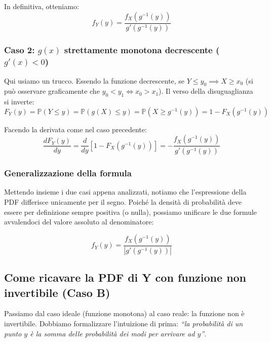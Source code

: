 In definitiva, otteniamo:
\begin{equation}
f_Y(y) = \frac{f_X(g^{-1}(y))}{g'(g^{-1}(y))}
\end{equation}

\subsubsection*{Caso 2: $g(x)$ strettamente monotona decrescente ($g'(x) < 0$)}

Qui usiamo un trucco. Essendo la funzione decrescente, se $Y \le y_0 \implies X \ge x_0$ (si può osservare graficamente che $y_0 < y_1 \iff x_0 > x_1$). Il verso della disuguaglianza si inverte:
\begin{equation}
F_Y(y) = \mathbb{P}(Y \le y) = \mathbb{P}(g(X) \le y) = \mathbb{P}(X \ge g^{-1}(y)) = 1 - F_X(g^{-1}(y))
\end{equation}

Facendo la derivata come nel caso precedente:
\begin{equation}
\frac{d F_Y(y)}{dy} = \frac{d}{dy} \left[ 1 - F_X(g^{-1}(y)) \right] = - \frac{f_X(g^{-1}(y))}{g'(g^{-1}(y))}
\end{equation}

\subsubsection*{Generalizzazione della formula}

Mettendo insieme i due casi appena analizzati, notiamo che l'espressione della PDF differisce unicamente per il segno. Poiché la densità di probabilità deve essere per definizione sempre positiva (o nulla), possiamo unificare le due formule avvalendoci del valore assoluto al denominatore:

\begin{equation}
\boxed{ f_Y(y) = \frac{f_X(g^{-1}(y))}{|g'(g^{-1}(y))|} }
\end{equation}

\subsection{Come ricavare la PDF di Y con funzione non invertibile (Caso B)}

Passiamo dal caso ideale (funzione monotona) al caso reale: la funzione non è invertibile. Dobbiamo formalizzare l'intuizione di prima: \textit{``la probabilità di un punto $y$ è la somma delle probabilità dei modi per arrivare ad $y$''}.


